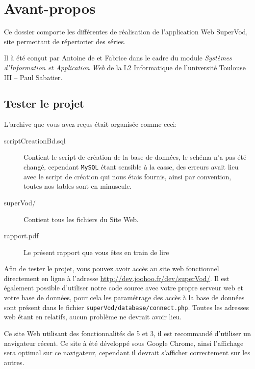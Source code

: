 \documentclass[12pt,a4paper,openany]{book}
\begin{document}
	\setcounter{tocdepth}{2}
	\setcounter{secnumdepth}{3}
	\maketitle
	\chapter*{Avant-propos}
	Ce dossier comporte les différentes de réalisation de l'application Web SuperVod, site permettant de répertorier des séries.

	Il à été conçut par Antoine de  et Fabrice  dans le cadre du module \textit{Systèmes d'Information et Application Web} de la L2 Informatique de l'université Toulouse III -- Paul Sabatier.

	\section*{Tester le projet}
	L'archive que vous avez reçus était organisée comme ceci: 
	\begin{description}
		\item[scriptCreationBd.sql] Contient le script de création de la base de données, le schéma n'a pas été changé, cependant \texttt{MySQL} étant sensible à la
			casse, des erreurs avait lieu avec le script de création qui nous étais fournis, ainsi par convention, toutes nos tables sont en minuscule.
		\item[superVod/] Contient tous les fichiers du Site Web. 
		\item[rapport.pdf] Le présent rapport que vous êtes en train de lire
	\end{description}

	Afin de tester le projet, vous pouvez avoir accès au site web fonctionnel directement en ligne à l'adresse \url{http://dev.joohoo.fr/dev/superVod/}. 
	Il est également possible d'utiliser notre code source avec votre propre serveur web et votre base de données, pour cela les paramétrage des accès à la base de données 
	sont présent dans le fichier \texttt{superVod/database/connect.php}. Toutes les adresses web étant en relatifs, aucun problème ne devrait avoir lieu.

	Ce site Web utilisant des fonctionnalités de 5 et 3, il est recommandé d'utiliser un navigateur récent. Ce site à été développé sous
	Google Chrome, ainsi l'affichage sera optimal sur ce navigateur, cependant il devrait s'afficher correctement sur les autres.
\end{document}

